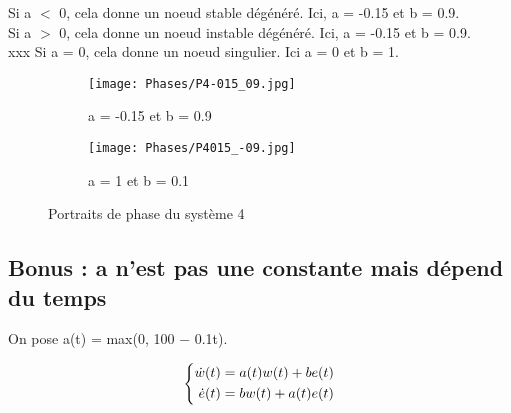 \documentclass[utf8]{article}
\begin{document}
Si a $<$ 0, cela donne un noeud stable dégénéré. Ici, a = -0.15 et b = 0.9.
\\
Si a $>$ 0, cela donne un noeud instable dégénéré. Ici, a = -0.15 et b = 0.9.
\\
xxx Si a = 0, cela donne un noeud singulier. Ici a = 0 et b = 1.


\begin{figure}[!htb]
\centering
\begin{subfigure}{.5\textwidth}
  \centering
  \texttt{[image: Phases/P4-015\_09.jpg]}
  \caption{a = -0.15 et b = 0.9}
  \label{fig:sub1}
\end{subfigure}%
\begin{subfigure}{.5\textwidth}
  \centering
  \texttt{[image: Phases/P4015\_-09.jpg]}
  \caption{a = 1 et b = 0.1}
  \label{fig:sub2}
  \end{subfigure}
\caption{Portraits de phase du système 4}
\end{figure}

\newpage

\subsection{Bonus : a n’est pas une constante mais dépend du temps}

On pose a(t) = max(0, 100 − 0.1t).

\begin{equation}
\centering
\left\{\begin{split}
\dot{w}(t) &= a(t)w(t) + be(t)\\
\dot{e}(t) &= bw(t) + a(t)e(t) \\
\end{split}\right.
 \end{equation}
\end{document}
